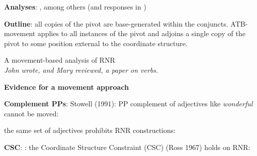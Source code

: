 \documentclass[paper=letter, fontsize=12pt]{scrartcl} %
\numberwithin{equation}{section} %
\numberwithin{figure}{section} %
\numberwithin{table}{section} %
\begin{document}
\textbf{Analyses}: \citealt{Ross:1967,Sabbagh:2007,Sabbagh:2008,Clapp:2008,Abe:2012}, among others (and responses in \citealt{Larson:2011,Larson:2012})


\textbf{Outline}: all copies of the pivot are base-generated within the conjuncts. ATB-movement applies to all instances of the pivot and adjoins a single copy of the pivot to some position external to the coordinate structure. 

\begin{exe}
\ex A movement-based analysis of RNR \\ 
 \textit{John wrote, and Mary reviewed, a paper on verbs.} \\
\begin{tree}
\end{tree}
\end{exe}
\vspace{30pt}

\textbf{Evidence for a movement approach}

\textbf{Complement PPs}: Stowell (1991): PP complement of adjectives like \textit{wonderful} cannot be moved:

\begin{exe}
\ex \begin{xlista}
	\label{pp-out3}
	\end{xlista}
\end{exe}

\cite{Postal:1998} the same set of adjectives prohibits RNR constructions:

\begin{exe}
\label{wonderful-bad}
\end{exe}

\textbf{CSC}: \cite{Wexler:1980}: the Coordinate Structure Constraint (CSC) (Ross 1967) holds on RNR:
\end{document}
